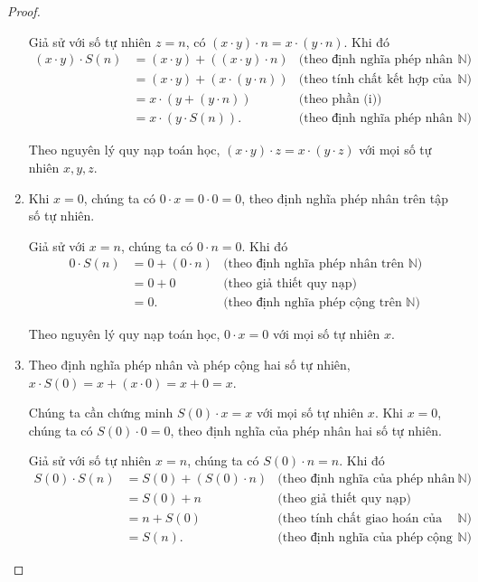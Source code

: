 \begin{proof}
\begin{enumerate}[label={(\roman*)}]
              Giả sử với số tự nhiên $z = n$, có $(x\cdot y)\cdot n = x\cdot (y\cdot n)$. Khi đó
              \begin{align*}
                  (x\cdot y)\cdot S(n) & = (x\cdot y) + ((x\cdot y)\cdot n) & \text{(theo định nghĩa phép nhân trên $\mathbb{N}$)}            \\
                                       & = (x\cdot y) + (x\cdot (y\cdot n)) & \text{(theo tính chất kết hợp của phép nhân trên $\mathbb{N}$)} \\
                                       & = x\cdot (y + (y\cdot n))          & \text{(theo phần (i))}                                          \\
                                       & = x\cdot (y\cdot S(n)).            & \text{(theo định nghĩa phép nhân trên $\mathbb{N}$)}
              \end{align*}

              Theo nguyên lý quy nạp toán học, $(x\cdot y)\cdot z = x\cdot (y\cdot z)$ với mọi số tự nhiên $x, y, z$.
        \item Khi $x = 0$, chúng ta có $0\cdot x = 0\cdot 0 = 0$, theo định nghĩa phép nhân trên tập số tự nhiên.

              Giả sử với $x = n$, chúng ta có $0\cdot n = 0$. Khi đó
              \begin{align*}
                  0\cdot S(n) & = 0 + (0\cdot n) & \text{(theo định nghĩa phép nhân trên $\mathbb{N}$)} \\
                              & = 0 + 0          & \text{(theo giả thiết quy nạp)}                      \\
                              & = 0.             & \text{(theo định nghĩa phép cộng trên $\mathbb{N}$)}
              \end{align*}

              Theo nguyên lý quy nạp toán học, $0\cdot x = 0$ với mọi số tự nhiên $x$.
        \item Theo định nghĩa phép nhân và phép cộng hai số tự nhiên, $x\cdot S(0) = x + (x\cdot 0) = x + 0 = x$.

              Chúng ta cần chứng minh $S(0)\cdot x = x$ với mọi số tự nhiên $x$. Khi $x = 0$, chúng ta có $S(0)\cdot 0 = 0$, theo định nghĩa của phép nhân hai số tự nhiên.

              Giả sử với số tự nhiên $x = n$, chúng ta có $S(0)\cdot n = n$. Khi đó
              \begin{align*}
                  S(0)\cdot S(n) & = S(0) + (S(0)\cdot n) & \text{(theo định nghĩa của phép nhân trên $\mathbb{N}$)}          \\
                                 & = S(0) + n             & \text{(theo giả thiết quy nạp)}                                   \\
                                 & = n + S(0)             & \text{(theo tính chất giao hoán của phép cộng trên $\mathbb{N}$)} \\
                                 & = S(n).                & \text{(theo định nghĩa của phép cộng trên $\mathbb{N}$)}
              \end{align*}


\end{enumerate}
\end{proof}
